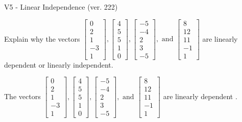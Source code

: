 \begin{exercise}
  \begin{exerciseTitle}V5 - Linear Independence (ver. 222)\end{exerciseTitle}
  \begin{exerciseStatement}
    Explain why the vectors \(\left[\begin{array}{r}
0 \\
2 \\
1 \\
-3 \\
1
\end{array}\right] , \left[\begin{array}{r}
4 \\
5 \\
5 \\
1 \\
0
\end{array}\right] , \left[\begin{array}{r}
-5 \\
-4 \\
2 \\
3 \\
-5
\end{array}\right] , \text{ and } \left[\begin{array}{r}
8 \\
12 \\
11 \\
-1 \\
1
\end{array}\right]\) are linearly dependent or linearly independent.	


  \end{exerciseStatement}
  \begin{exerciseAnswer}
   The vectors \(\left[\begin{array}{r}
0 \\
2 \\
1 \\
-3 \\
1
\end{array}\right] , \left[\begin{array}{r}
4 \\
5 \\
5 \\
1 \\
0
\end{array}\right] , \left[\begin{array}{r}
-5 \\
-4 \\
2 \\
3 \\
-5
\end{array}\right] , \text{ and } \left[\begin{array}{r}
8 \\
12 \\
11 \\
-1 \\
1
\end{array}\right]\) are 
  	 linearly dependent  .
  


  \end{exerciseAnswer}
\end{exercise}